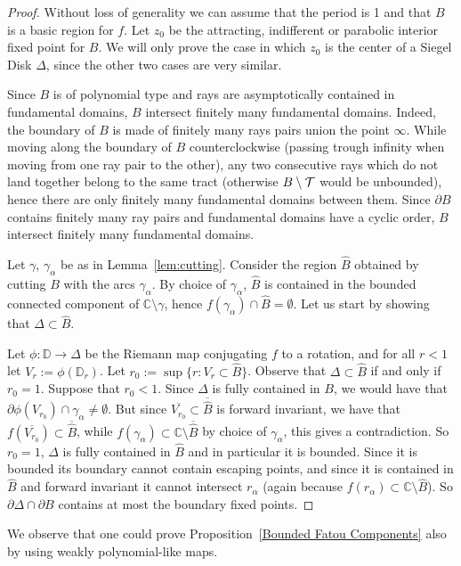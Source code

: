 \documentclass[11pt, twoside]{article}
\theoremstyle{definition}
\newcommand{\C}{\mathbb{C}}
\newcommand{\D}{\mathbb{D}}
\newcommand{\ov}{\overline}
\newcommand{\ra}{\rightarrow}
\newcommand{\TT}{{\cal T}}
\renewcommand{\hat}{\widehat}
\renewcommand{\hat}{\widehat}
\newcommand{\De}{\Delta}
\newcommand{\Bhat}{\widehat{B}}
\begin{document}
\begin{proof}
Without loss of generality we can assume that the period is 1 and that $B$ is a basic region for $f$.  
Let $z_0$ be the attracting, indifferent or parabolic interior fixed point for $B$. We will only prove the case in which $z_0$ is the center of a Siegel Disk $\De$, since the other two cases are very similar.
 
 Since $B$ is of polynomial type and rays are asymptotically contained in fundamental domains, $B$ intersect finitely many fundamental domains. Indeed, the boundary of $B$ is made of finitely many rays pairs union the point $\infty$. While moving along the boundary of $B$ counterclockwise (passing trough infinity when moving from one ray pair to the other), any two consecutive rays which do not land together belong to the same tract (otherwise $B\setminus \TT$ would be unbounded), hence there are only finitely many fundamental domains between them. Since $\partial B$ contains finitely many ray pairs and fundamental domains have a cyclic order, $B$ intersect finitely many fundamental domains.
 
Let $\gamma$,  $\gamma_\alpha$ be as in  Lemma~\ref{lem:cutting}. Consider the region $\Bhat$ obtained by cutting $B$ with the arcs $\gamma_\alpha$. By choice of $\gamma_\alpha$, $\hat{B}$ is contained in the bounded connected component of $\C\setminus \gamma$, hence  $f(\gamma_\alpha)\cap \hat{B}=\emptyset$. Let us  start by showing that $\De\subset\Bhat$.

Let $\phi:\D\ra\De$ be the Riemann map conjugating $f$ to a rotation, and for all $r<1$ let $V_r:=\phi(\D_r)$. 
Let $r_0:=\sup\{r: V_r\subset\Bhat\}$. Observe that $\De\subset \Bhat$ if and only if $r_0=1$. Suppose that $r_0<1$. Since $\De$ is fully contained in $B$, we would have that $\partial \phi(V_{r_0})\cap \gamma_\alpha\neq\emptyset$. But since $\ov{V_{r_0}}\subset \ov{\Bhat}$ is forward invariant, we have that $f(\ov{V_{r_0}})\subset \ov{\Bhat}$, while   $f(\gamma_\alpha)\subset\C\setminus\ov{\Bhat}$ by choice of $\gamma_\alpha$, this gives a contradiction.
 So $r_0=1$, $\De$ is fully contained in $\Bhat$ and  in particular it is bounded. Since it is bounded its boundary cannot contain escaping points, and since it is contained in $\Bhat$ and forward invariant it cannot intersect $r_\alpha$ (again because $f(r_\alpha)\subset\C\setminus\Bhat$). 
  So $\partial\De\cap \partial B$ contains at most the boundary fixed points.  
\end{proof}
We observe that one could prove Proposition~\ref{Bounded Fatou Components} also by using weakly polynomial-like maps.  
\end{document}
